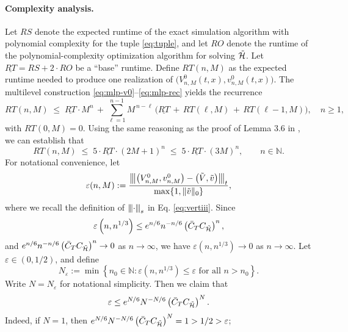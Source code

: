 \documentclass[11pt]{article}
\theoremstyle{definition}
\theoremstyle{plain}
\newcommand{\N}{\mathbb{N}}
\newcommand{\cH}{{\cal H}}
\newcommand{\veps}{\varepsilon}
\newcommand{\vertiii}[1]{{\left\vert\kern-0.25ex\left\vert\kern-0.25ex\left\vert #1 
    \right\vert\kern-0.25ex\right\vert\kern-0.25ex\right\vert}}
\begin{document}
\begin{appendices}
  \paragraph{Complexity analysis.} Let $RS$ denote the expected runtime of the exact simulation algorithm with polynomial complexity for the tuple \eqref{eq:tuple}, 
  and let $RO$ denote the runtime of the polynomial-complexity optimization algorithm for solving $\tilde \cH$.
  Let $\underline{RT} = RS + 2\cdot RO$ be a ``base'' runtime. 
  Define $RT(n,M)$ as the expected runtime needed to produce one realization of $\big(V^0_{n,M}(t,x), v^0_{n,M}(t,x)\big)$. The multilevel construction \eqref{eq:mlp-v0}--\eqref{eq:mlp-rec} yields the recurrence
  \begin{equation}
  RT(n,M) \;\le\; \underline{RT} \cdot M^n \, + \, \sum_{\ell=1}^{n-1} M^{\,n-\ell}\,\Big(\underline{RT} \, + \, RT(\ell,M) \, + \, RT(\ell{-}1,M)\Big), \quad n\ge 1,
  \end{equation}
  with $RT(0,M)=0$. Using the same reasoning as the proof of Lemma 3.6 in \cite{HJKNW2020}, we can establish that  
  \begin{equation}\label{eq:work-upper}
  RT(n,M) \;\le\; 5\cdot\underline{RT}\cdot (2M{+}1)^n \;\le\; 5\cdot\underline{RT}\cdot (3M)^n, \qquad n\in \N.
  \end{equation}
  For notational convenience, let
  \begin{equation}
  \veps(n,M) := \frac{\vertiii{\left(V_{n,M}^{0}, v_{n,M}^{0}\right) - \left(\tilde V, \tilde{v}\right)}_{t}}{\max\{1, \|\tilde v\|_0\}},
  \end{equation}
  where we recall the definition of $\vertiii{\cdot}_s$ in Eq. \eqref{eq:vertiii}.
  Since 
  \[
  \veps\left(n, n^{1/3} \right) \leq e^{n/6} n^{-n/6} \left(\bar C_T C_{\tilde \cH} \right)^n, 
  \]
  and $e^{n/6} n^{-n/6}\left(\bar C_T C_{\tilde \cH} \right)^n \to 0$ as $n \to \infty$, we have $\veps\left(n, n^{1/3}\right) \to 0$ as $n \to \infty$. 
  Let $\veps\in (0, 1/2)$, and define
  \begin{equation}
  N_\veps := \min \left\{n_0 \in \N : \veps\left(n, n^{1/3}\right) \leq \veps  \text{ for all } n > n_0\right\}.
  \end{equation}
  Write $N = N_\veps$ for notational simplicity. Then we claim that 
  \begin{equation}
  \veps \leq e^{N/6} N^{-N/6} \left(\bar C_T C_{\tilde \cH} \right)^N.
  \end{equation}
  Indeed, if $N=1$, then $e^{N/6} N^{-N/6} \left(\bar C_T C_{\tilde \cH} \right)^N = 1 > 1/2 > \veps$; 

\end{appendices}
\end{document}
